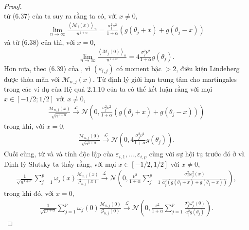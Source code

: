 \begin{proof}
$$$$
từ (6.37) của \cite{bercu} ta suy ra rằng ta có, với $x \neq 0$,
\begin{align}
    \lim _{n \rightarrow \infty} \frac{\left\langle\mathcal{M}_{j}(x)\right\rangle_{n}}{n^{1+\alpha}}=\frac{\sigma_{j}^{2} \nu^{2}}{1+\alpha}\left(g\left(\theta_{j}+x\right)+g\left(\theta_{j}-x\right)\right)
    \label{9.18}
\end{align}
và từ (6.38) của \cite{bercu} thì, với $x=0$,
\begin{align}
    \lim _{n \rightarrow \infty} \frac{\left\langle\mathcal{M}_{j}(0)\right\rangle_{n}}{n^{1+\alpha}}=4 \frac{\sigma_{j}^{2} \nu^{2}}{1+\alpha} g\left(\theta_{j}\right).
    \label{9.19}
\end{align}
Hơn nữa, theo (6.39) của \cite{bercu}, vì $\left(\varepsilon_{i, j}\right)$ có moment bậc $>2$, điều kiện Lindeberg được thỏa mãn với $\mathcal{M}_{n, j}(x)$. Từ định lý giới hạn trung tâm cho martingales trong các ví dụ của Hệ quả 2.1.10 của \cite{duflo} ta có thể kết luận rằng với mọi $x \in[-1 / 2 ; 1 / 2]$ với $x \neq 0$,
\begin{align}
    \frac{\mathcal{M}_{n, j}(x)}{\sqrt{n^{1+\alpha}}} \stackrel{\mathcal{L}}{\longrightarrow} \mathcal{N}\left(0, \frac{\sigma_{j}^{2} \nu^{2}}{1+\alpha}\left(g\left(\theta_{j}+x\right)+g\left(\theta_{j}-x\right)\right)\right)
    \label{9.20}
\end{align}
trong khi, với $x=0$,
\begin{align}
    \frac{\mathcal{M}_{n, j}(0)}{\sqrt{n^{1+\alpha}}} \stackrel{\mathcal{L}}{\longrightarrow} \mathcal{N}\left(0,4 \frac{\sigma_{j}^{2} \nu^{2}}{1+\alpha} g\left(\theta_{j}\right)\right).
    \label{9.21}
\end{align}
Cuối cùng, từ  và  và tính độc lập của $\varepsilon_{i, 1}, \ldots, \varepsilon_{i, p}$ cùng với sự hội tụ trước đó ở  và Định lý Slutsky ta thấy rằng, với mọi $x \in[-1 / 2,1 / 2]$ với $x \neq 0$,
\begin{align}
    \frac{1}{\sqrt{n^{1+\alpha}}} \sum_{j=1}^{p} \omega_{j}(x) \frac{\mathcal{M}_{n, j}(x)}{\mathcal{G}_{n, j}(x)} \stackrel{\mathcal{L}}{\longrightarrow} \mathcal{N}\left(0, \frac{\nu^{2}}{1+\alpha} \sum_{j=1}^{p} \frac{\sigma_{j}^{2} \omega_{j}^{2}(x)}{a_{j}^{2}\left(g\left(\theta_{j}+x\right)+g\left(\theta_{j}-x\right)\right)}\right),
    \label{9.22}
\end{align}
trong khi đó, với $x=0$,
\begin{align}
    \frac{1}{\sqrt{n^{1+\alpha}}} \sum_{j=1}^{p} \omega_{j}(0) \frac{\mathcal{M}_{n, j}(0)}{\mathcal{G}_{n, j}(0)} \stackrel{\mathcal{L}}{\longrightarrow} \mathcal{N}\left(0, \frac{\nu^{2}}{1+\alpha} \sum_{j=1}^{p} \frac{\sigma_{j}^{2} \omega_{j}^{2}(0)}{a_{j}^{2} g\left(\theta_{j}\right)}\right).

\end{align}
\end{proof}

